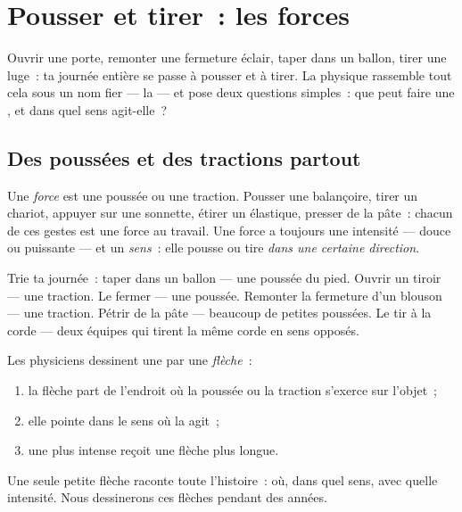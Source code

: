 \chapter{Pousser et tirer~: les forces}\label{ch:g2:pushes-and-pulls}

Ouvrir une porte, remonter une fermeture éclair, taper dans un
ballon, tirer une luge~: ta journée entière se passe à pousser et à
tirer. La physique rassemble tout cela sous un nom fier --- la
 --- et pose deux questions simples~: que peut faire une ,
et dans quel sens agit-elle~?

\section{Des poussées et des tractions partout}

\begin{definition}[Force]\label{def:g2:pushes-and-pulls:force}
Une \emph{force} est une poussée ou une traction.
Pousser une balançoire, tirer un chariot, appuyer sur une sonnette,
étirer un élastique, presser de la pâte~: chacun de ces gestes est
une force au travail. Une force a toujours une intensité --- douce ou
puissante --- et un \emph{sens}~: elle pousse ou tire \emph{dans une
certaine direction}.
\end{definition}

\begin{example}\label{ex:g2:pushes-and-pulls:sort}
Trie ta journée~: taper dans un ballon --- une poussée du pied.
Ouvrir un tiroir --- une traction. Le fermer --- une poussée. Remonter
la fermeture d'un blouson --- une traction. Pétrir de la pâte ---
beaucoup de petites poussées. Le tir à la corde --- deux équipes qui
tirent la même corde en sens opposés.
\end{example}

\begin{method}\label{met:g2:pushes-and-pulls:arrow}
Les physiciens dessinent une  par une \emph{flèche}~:
\begin{enumerate}
  \item la flèche part de l'endroit où la poussée ou la traction
        s'exerce sur l'objet~;
  \item elle pointe dans le sens où la  agit~;
  \item une  plus intense reçoit une flèche plus longue.
\end{enumerate}
Une seule petite flèche raconte toute l'histoire~: où, dans quel
sens, avec quelle intensité. Nous dessinerons ces flèches pendant des
années.
\end{method}

